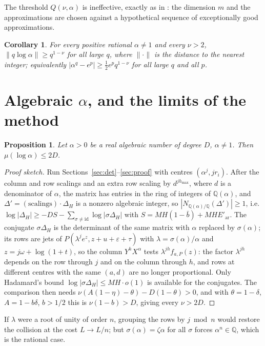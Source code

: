 \documentclass[11pt]{amsart}
\newtheorem{proposition}[lemma]{Proposition}
\newtheorem{corollary}[lemma]{Corollary}
\newcommand{\Q}{\mathbb{Q}}
\newcommand{\eps}{\varepsilon}
\begin{document}
The threshold $Q(\nu,\alpha)$ is ineffective, exactly as in \cite{OAI}: the dimension $m$ and the approximations are chosen against a hypothetical sequence of exceptionally good approximations.

\begin{corollary}
For every positive rational $\alpha\ne1$ and every $\nu>2$, $\|q\log\alpha\|\ge q^{1-\nu}$ for all large $q$, where $\|\cdot\|$ is the distance to the nearest integer; equivalently $|\alpha^q-e^p|\ge\tfrac12e^pq^{1-\nu}$ for all large $q$ and all $p$.
\end{corollary}

\section{Algebraic $\alpha$, and the limits of the method}\label{sec:limits}

\begin{proposition}\label{alg}
Let $\alpha>0$ be a real algebraic number of degree $D$, $\alpha\ne1$. Then $\mu(\log\alpha)\le2D$.
\end{proposition}

\begin{proof}[Proof sketch]
Run Sections~\ref{sec:det}--\ref{sec:proof} with centres $(\alpha^j,jr_i)$. After the column and row scalings and an extra row scaling by $d^{jh_{\max}}$, where $d$ is a denominator of $\alpha$, the matrix has entries in the ring of integers of $\Q(\alpha)$, and $\Delta'=(\text{scalings})\cdot\Delta_H$ is a nonzero algebraic integer, so $|N_{\Q(\alpha)/\Q}(\Delta')|\ge1$, i.e. $\log|\Delta_H|\ge-DS-\sum_{\sigma\ne\mathrm{id}}\log|\sigma\Delta_H|$ with $S=MH(1-\bar b)+MHE'_{\mathrm{ar}}$. The conjugate $\sigma\Delta_H$ is the determinant of the same matrix with $\alpha$ replaced by $\sigma(\alpha)$; its rows are jets of $P(\lambda^je^z,z+u+\eps+\tau)$ with $\lambda=\sigma(\alpha)/\alpha$ and $z=j\omega+\log(1+t)$, so the column $Y^hX^\alpha$ tests $\lambda^{jh}f_{a,P}(z)$: the factor $\lambda^{jh}$ depends on the row through $j$ and on the column through $h$, and rows at different centres with the same $(a,d)$ are no longer proportional. Only Hadamard's bound $\log|\sigma\Delta_H|\le MH\cdot o(1)$ is available for the conjugates. The comparison then needs $\nu(A(1-\eta)-\theta)-D(1-\theta)>0$, and with $\theta=1-\delta$, $A=1-b\delta$, $b>1/2$ this is $\nu(1-b)>D$, giving every $\nu>2D$.
\end{proof}

If $\lambda$ were a root of unity of order $n$, grouping the rows by $j\bmod n$ would restore the collision at the cost $L\to L/n$; but $\sigma(\alpha)=\zeta\alpha$ for all $\sigma$ forces $\alpha^n\in\Q$, which is the rational case.
\end{document}
